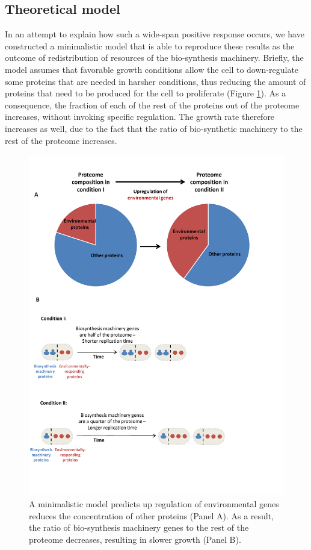 \documentclass[a4paper,landscape,17pt]{extarticle}
\begin{document}
\clearpage        
\subsection*{Theoretical model}
In an attempt to explain how such a wide-span positive response occurs, we have constructed a minimalistic model that is able to reproduce these results as the outcome of redistribution of resources of the bio-synthesis machinery.
Briefly, the model assumes that favorable growth conditions allow the cell to down-regulate some proteins that are needed in harsher conditions, thus reducing the amount of proteins that need to be produced for the cell to proliferate (Figure \ref{fig:model}).
As a consequence, the fraction of each of the rest of the proteins out of the proteome increases, without invoking specific regulation.
The growth rate therefore increases as well, due to the fact that the ratio of bio-synthetic machinery to the rest of the proteome increases.

\clearpage
\begin{landscape}
\begin{figure}[h]
\centering
\includegraphics[scale=0.9]{Figures7-trieste.pdf}
\caption{\linespread{0.5}\selectfont{}
  A minimalistic model predicts up regulation of environmental genes reduces the concentration of other proteins (Panel A).
As a result, the ratio of bio-synthesis machinery genes to the rest of the proteome decreases, resulting in slower growth (Panel B).
}
\label{fig:model}
\end{figure}
\end{landscape}
\clearpage        


\printbibliography
\end{document}
